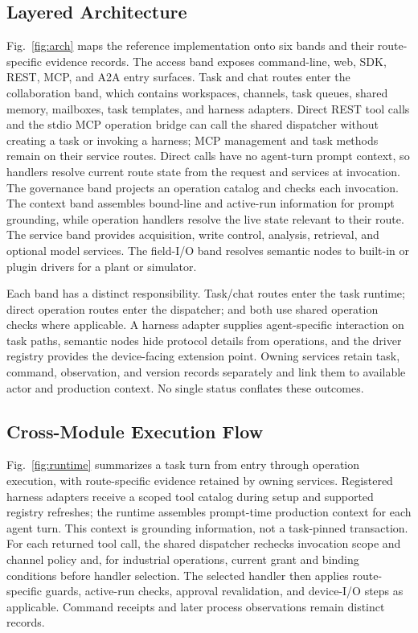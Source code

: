 \subsection{Layered Architecture}
\label{sec:layers}
\label{sec:arch}
Fig.~\ref{fig:arch} maps the reference implementation onto six bands and
their route-specific evidence records. The access band exposes command-line,
web, SDK, REST, MCP, and A2A entry surfaces. Task and chat routes enter the
collaboration band, which contains workspaces, channels, task queues, shared
memory, mailboxes, task templates, and harness adapters. Direct REST tool
calls and the stdio MCP operation bridge can call the shared dispatcher
without creating a task or invoking a harness; MCP management and task methods
remain on their service routes. Direct calls have no agent-turn prompt
context, so handlers resolve current route state from the request and services
at invocation. The governance band projects an operation catalog and
checks each invocation. The context band assembles bound-line and active-run
information for prompt grounding, while operation handlers resolve the live
state relevant to their route. The service band provides acquisition, write
control, analysis, retrieval, and optional model services. The field-I/O band
resolves semantic nodes to built-in or plugin drivers for a plant or
simulator.

Each band has a distinct responsibility. Task/chat routes enter the task
runtime; direct operation routes enter the dispatcher; and both use shared
operation checks where applicable. A harness adapter supplies
agent-specific interaction on task paths, semantic nodes hide protocol
details from operations, and the driver registry provides the device-facing
extension point. Owning services retain task, command, observation, and
version records separately and link them to available actor and production
context. No single status conflates these outcomes.

\subsection{Cross-Module Execution Flow}
\label{sec:executionflow}
Fig.~\ref{fig:runtime} summarizes a task turn from entry through operation
execution, with route-specific evidence retained by owning services. Registered
harness adapters receive a scoped tool catalog during setup and supported
registry refreshes; the runtime assembles prompt-time production context for
each agent turn. This context is grounding information, not a task-pinned
transaction. For each returned tool call, the shared dispatcher rechecks
invocation scope and channel policy and, for industrial operations, current
grant and binding conditions before handler selection. The selected handler
then applies route-specific guards, active-run checks, approval
revalidation, and device-I/O steps as applicable. Command receipts and later
process observations remain distinct records.


